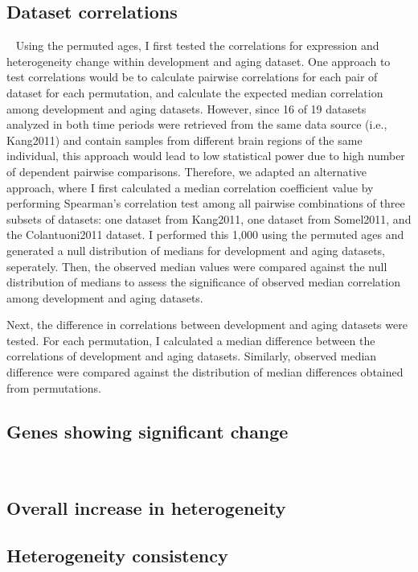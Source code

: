 \subsection{Dataset correlations}~\label{subsec:perm.corr}
Using the permuted ages, I first tested the correlations for expression and heterogeneity change within development and aging dataset.
One approach to test correlations would be to calculate pairwise correlations for each pair of dataset for each permutation,
and calculate the expected median correlation among development and aging datasets.
However, since 16 of 19 datasets analyzed in both time periods were retrieved from the same data source (i.e., Kang2011) and contain samples from different brain regions of the same individual,
this approach would lead to low statistical power due to high number of dependent pairwise comparisons.
Therefore, we adapted an alternative approach, where I first calculated a median correlation coefficient value
by performing Spearman's correlation test among all pairwise combinations of three subsets of datasets: one dataset from Kang2011, one dataset from Somel2011, and the Colantuoni2011 dataset.
I performed this 1,000 using the permuted ages and generated a null distribution of medians for development and aging datasets, seperately. 
Then, the observed median values were compared against the null distribution of medians to assess the significance of observed median correlation among development and aging datasets.

Next, the difference in correlations between development and aging datasets were tested. 
For each permutation, I calculated a median difference between the correlations of development and aging datasets.
Similarly, observed median difference were compared against the distribution of median differences obtained from permutations.

\subsection{Genes showing significant change}~\label{subsec:perm.sig.change}


\subsection{Overall increase in heterogeneity}

\subsection{Heterogeneity consistency}

